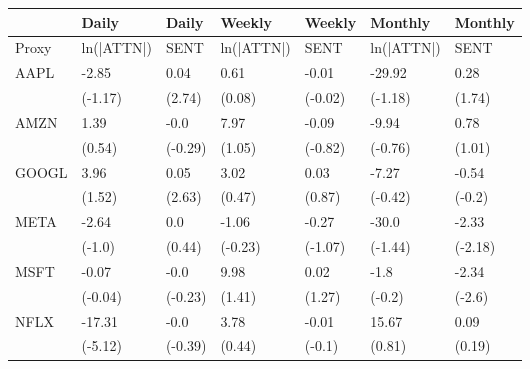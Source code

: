 \begin{tabular}{lllllll}
\toprule
{} &       Daily &    Daily &      Weekly &   Weekly &     Monthly &  Monthly \\
\midrule
Proxy &  ln(|ATTN|) &     SENT &  ln(|ATTN|) &     SENT &  ln(|ATTN|) &     SENT \\
AAPL  &       -2.85 &     0.04 &        0.61 &    -0.01 &      -29.92 &     0.28 \\
      &     (-1.17) &   (2.74) &      (0.08) &  (-0.02) &     (-1.18) &   (1.74) \\
AMZN  &        1.39 &     -0.0 &        7.97 &    -0.09 &       -9.94 &     0.78 \\
      &      (0.54) &  (-0.29) &      (1.05) &  (-0.82) &     (-0.76) &   (1.01) \\
GOOGL &        3.96 &     0.05 &        3.02 &     0.03 &       -7.27 &    -0.54 \\
      &      (1.52) &   (2.63) &      (0.47) &   (0.87) &     (-0.42) &   (-0.2) \\
META  &       -2.64 &      0.0 &       -1.06 &    -0.27 &       -30.0 &    -2.33 \\
      &      (-1.0) &   (0.44) &     (-0.23) &  (-1.07) &     (-1.44) &  (-2.18) \\
MSFT  &       -0.07 &     -0.0 &        9.98 &     0.02 &        -1.8 &    -2.34 \\
      &     (-0.04) &  (-0.23) &      (1.41) &   (1.27) &      (-0.2) &   (-2.6) \\
NFLX  &      -17.31 &     -0.0 &        3.78 &    -0.01 &       15.67 &     0.09 \\
      &     (-5.12) &  (-0.39) &      (0.44) &   (-0.1) &      (0.81) &   (0.19) \\
\bottomrule
\end{tabular}

